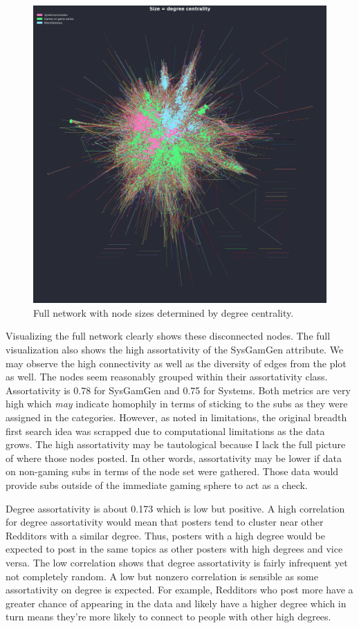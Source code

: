 \documentclass[12pt, a4paper]{article}
\begin{document}
\begin{figure}[ht!]
  \centering
  \includegraphics[width=\textwidth]{network_degcent.png}
  \caption{Full network with node sizes determined by degree centrality.}
  \label{fig:fullnet}
\end{figure}

Visualizing the full network clearly shows these disconnected nodes. The full visualization also shows the high assortativity of the SysGamGen attribute. We may observe the high connectivity as well as the diversity of edges from the plot as well. The nodes seem reasonably grouped within their assortativity class. Assortativity is 0.78 for SysGamGen and 0.75 for Systems. Both metrics are very high which \textit{may} indicate homophily in terms of sticking to the subs as they were assigned in the categories. However, as noted in limitations, the original breadth first search idea was scrapped due to computational limitations as the data grows. The high assortativity may be tautological because I lack the full picture of where those nodes posted. In other words, assortativity may be lower if data on non-gaming subs in terms of the node set were gathered. Those data would provide subs outside of the immediate gaming sphere to act as a check.

Degree assortativity is about 0.173 which is low but positive. A high correlation for degree assortativity would mean that posters tend to cluster near other Redditors with a similar degree. Thus, posters with a high degree would be expected to post in the same topics as other posters with high degrees and vice versa. The low correlation shows that degree assortativity is fairly infrequent yet not completely random. A low but nonzero correlation is sensible as some assortativity on degree is expected. For example, Redditors who post more have a greater chance of appearing in the data and likely have a higher degree which in turn means they're more likely to connect to people with other high degrees.
\end{document}

